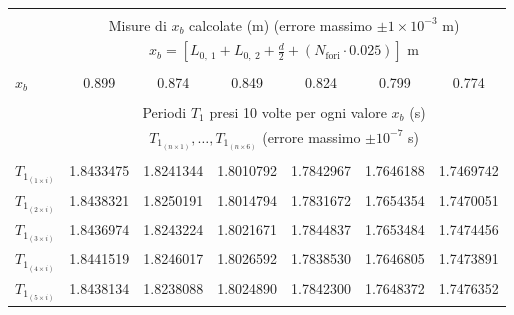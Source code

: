 \begin{table*}[t!]
    \centering
    \caption{}
    \footnotesize
    \label{table:raw_data}
    \begin{tabular}{l*{6}{c}}
        \hline\hline\\[-1.5ex]
                               & \multicolumn{6}{c}{Misure di $x_b$ calcolate (m) (errore massimo $\pm1\times10^{-3}$ m)}                 \\[+0.5ex] 
                               & \multicolumn{6}{c}{$x_b=\left[L_{0,~1} + L_{0,~2} + \frac{d}{2} + (N_{\text{fori}}\cdot0.025)\right]$ m} \\[+0.5ex] \hline \\[-1.5ex]
        $x_b$                  & 0.899     & 0.874              & 0.849              & 0.824     & 0.799     & 0.774                      \\[+0.5ex] \hline \\[-1.5ex]
                               & \multicolumn{6}{c}{Periodi $T_1$ presi 10 volte per ogni valore $x_b$ (s)}                               \\[+0.5ex]
                               & \multicolumn{6}{c}{$T_{1_{(n \times 1)}}, \ldots, T_{1_{(n \times 6)}}$ (errore massimo $\pm10^{-7}$ s)} \\[+0.5ex] \hline \\[-1.5ex]
        $T_{1_{(1 \times i)}}$ & 1.8433475 & 1.8241344          & 1.8010792          & 1.7842967 & 1.7646188 & 1.7469742                  \\[+0.5ex]
        $T_{1_{(2 \times i)}}$ & 1.8438321 & 1.8250191          & 1.8014794          & 1.7831672 & 1.7654354 & 1.7470051                  \\[+0.5ex]
        $T_{1_{(3 \times i)}}$ & 1.8436974 & 1.8243224          & 1.8021671          & 1.7844837 & 1.7653484 & 1.7474456                  \\[+0.5ex]
        $T_{1_{(4 \times i)}}$ & 1.8441519 & 1.8246017          & 1.8026592          & 1.7838530 & 1.7646805 & 1.7473891                  \\[+0.5ex]
        $T_{1_{(5 \times i)}}$ & 1.8438134 & 1.8238088          & 1.8024890          & 1.7842300 & 1.7648372 & 1.7476352                  \\[+0.5ex]

\end{tabular}
\end{table*}

